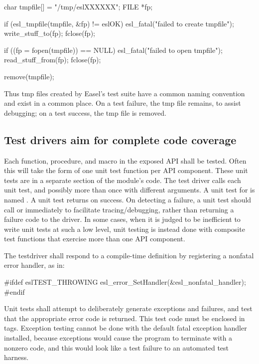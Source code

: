 \begin{cchunk}
   char  tmpfile[] = "/tmp/eslXXXXXX";
   FILE *fp;

   if (esl_tmpfile(tmpfile, &fp) != eslOK) esl_fatal("failed to create tmpfile");
   write_stuff_to(fp);
   fclose(fp);

   if ((fp = fopen(tmpfile)) == NULL) esl_fatal("failed to open tmpfile");
   read_stuff_from(fp);
   fclose(fp);

   remove(tmpfile);
\end{cchunk}

Thus tmp files created by Easel's test suite have a common naming
convention and exist in a common place. On a test failure, the tmp
file remains, to assist debugging; on a test success, the tmp file is
removed.

\subsection{Test drivers aim for complete code coverage}

Each function, procedure, and macro in the exposed API shall be
tested. Often this will take the form of one unit test function per
API component. These unit tests are in a separate section of the
module's code. The test driver calls each unit test, and possibly more
than once with different arguments.  A unit test for
 is named . A
unit test returns  on success.  On detecting a failure, a
unit test should call  or 
immediately to facilitate tracing/debugging, rather than returning a
failure code to the driver. In some cases, when it is judged to be
inefficient to write unit tests at such a low level, unit testing is
instead done with composite test functions that exercise more than one
API component.

The testdriver shall respond to a 
compile-time definition by registering a nonfatal error handler, as
in:
\begin{cchunk}
      #ifdef eslTEST_THROWING
        esl_error_SetHandler(&esl_nonfatal_handler);
      #endif
\end{cchunk}

Unit tests shall attempt to deliberately generate exceptions and
failures, and test that the appropriate error code is returned.  This
test code must be enclosed in  tags.
Exception testing cannot be done with the default fatal exception
handler installed, because exceptions would cause the program to
terminate with a nonzero code, and this would look like a test failure
to an automated test harness.

